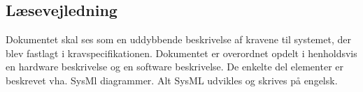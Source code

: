\subsection{Læsevejledning}
Dokumentet skal ses som en uddybbende beskrivelse af kravene til systemet, der blev fastlagt i kravspecifikationen. Dokumentet er overordnet opdelt i henholdsvis en hardware beskrivelse og en software beskrivelse. 
De enkelte del elementer er beskrevet vha. SysMl diagrammer. Alt SysML udvikles og skrives på engelsk.